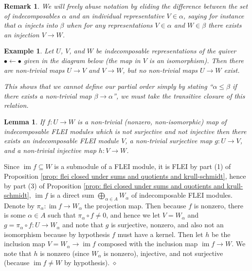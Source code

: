 \documentclass{article}
\newcommand{\im}{\operatorname{im}}
\newtheorem{lemma}{Lemma}[section]
\newtheorem{example}{Example}[section]
\newtheorem{remark}{Remark}[section]
\newenvironment{proof}{\vspace*{2ex}\noindent {\em Proof:}
}{\hfill $\diamond$ \\[2ex]}
\begin{document}
\begin{remark}
  We will freely abuse notation by eliding the difference between the set of indecomposables $\alpha$ and an individual representative $V \in \alpha$, saying for instance that  $\alpha$ injects into $\beta$ when for any representations $V \in \alpha$ and $W \in  \beta$ there exists an injection $V \to W$.
\end{remark}

\begin{example}
Let $U$, $V$, and $W$ be indecomposable representations of the quiver $\bullet \leftarrow \bullet$ given in the diagram below (the map in $V$ is an isomorphism). Then there are non-trivial maps $U \to V$ and $V \to W$, but no non-trivial maps $U \to W$ exist. 
\begin{center}
\end{center}
This shows that we cannot define our partial order simply by stating ``$\alpha \leq \beta$ if there exists a non-trivial map $\beta \to \alpha$'', we must take the transitive closure of this relation.
\end{example}

\begin{lemma} \label{lem: break up non-trivial maps into compositions of simple non-trivial maps}
    If $f : U \to W$ is a non-trivial (nonzero, non-isomorphic) map of indecomposable FLEI modules which is not surjective and not injective then there exists an indecomposable FLEI module $V$, a non-trivial surjective map $g : U \to V$, and a non-trivial injective map $h : V \to W$. 
\end{lemma}

\begin{proof} 
Since $\im f \subseteq W$ is a submodule of a FLEI module, it is FLEI by part (1) of Proposition \ref{prop: flei closed under sums and quotients and krull-schmidt}, hence by part (3) of Proposition \ref{prop: flei closed under sums and quotients and krull-schmidt}, $\im f$ is a direct sum $\bigoplus_{\alpha \in A} W_\alpha$ of indecomposable FLEI modules. Denote by $\pi_\alpha : \im f \to W_\alpha$ the projection map. Then because $f$ is nonzero, there is some $\alpha \in A$ such that $\pi_\alpha \circ f \neq 0$, and hence we let $V = W_\alpha$ and $g= \pi_\alpha \circ f : U \to W_\alpha$ and note that $g$ is surjective, nonzero, and also not an isomorphism because by hypothesis $f$ must have a kernel. Then let $h$ be the inclusion map $V = W_\alpha \to \im f$ composed with the inclusion map $\im f \to W$. We note that $h$ is nonzero (since $W_\alpha$ is nonzero), injective, and not surjective (because $\im f \neq W$ by hypothesis). 
\end{proof}
\end{document}
